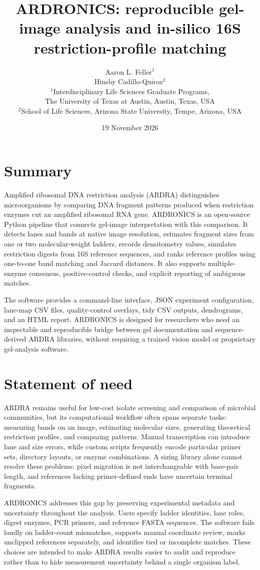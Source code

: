 \documentclass[
  11pt]{article}
\title{ARDRONICS: reproducible gel-image analysis and in-silico 16S
restriction-profile matching}
\author{Aaron L. Feller$^{1}$\\[2pt] Hinsby Cadillo-Quiroz$^{2}$\\[4pt]
\small $^{1}$Interdisciplinary Life Sciences Graduate Programs,\\
\small The University of Texas at Austin, Austin, Texas, USA\\
\small $^{2}$School of Life Sciences, Arizona State University, Tempe, Arizona, USA}
\date{19 November 2026}
\begin{document}
\maketitle

\section{Summary}\label{summary}

Amplified ribosomal DNA restriction analysis (ARDRA) distinguishes
microorganisms by comparing DNA fragment patterns produced when
restriction enzymes cut an amplified ribosomal RNA gene. ARDRONICS is an
open-source Python pipeline that connects gel-image interpretation with
this comparison. It detects lanes and bands at native image resolution,
estimates fragment sizes from one or two molecular-weight ladders,
records densitometry values, simulates restriction digests from 16S
reference sequences, and ranks reference profiles using one-to-one band
matching and Jaccard distances. It also supports multiple-enzyme
consensus, positive-control checks, and explicit reporting of ambiguous
matches.

The software provides a command-line interface, JSON experiment
configuration, lane-map CSV files, quality-control overlays, tidy CSV
outputs, dendrograms, and an HTML report. ARDRONICS is designed for
researchers who need an inspectable and reproducible bridge between gel
documentation and sequence-derived ARDRA libraries, without requiring a
trained vision model or proprietary gel-analysis software.

\section{Statement of need}\label{statement-of-need}

ARDRA remains useful for low-cost isolate screening and comparison of
microbial communities, but its computational workflow often spans
separate tasks: measuring bands on an image, estimating molecular sizes,
generating theoretical restriction profiles, and comparing patterns.
Manual transcription can introduce lane and size errors, while custom
scripts frequently encode particular primer sets, directory layouts, or
enzyme combinations. A sizing library alone cannot resolve these
problems: pixel migration is not interchangeable with base-pair length,
and references lacking primer-defined ends have uncertain terminal
fragments.

ARDRONICS addresses this gap by preserving experimental metadata and
uncertainty throughout the analysis. Users specify ladder identities,
lane roles, digest enzymes, PCR primers, and reference FASTA sequences.
The software fails loudly on ladder-count mismatches, supports manual
coordinate review, marks unclipped references separately, and identifies
tied or incomplete matches. These choices are intended to make ARDRA
results easier to audit and reproduce rather than to hide measurement
uncertainty behind a single organism label.
\end{document}
